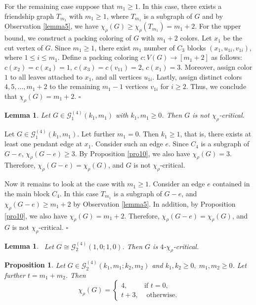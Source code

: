 \documentclass[12pt]{article}
\newtheorem{lemma}[theorem]{Lemma}
\newtheorem{proposition}[theorem]{Proposition}
\newcommand{\proof}{\noindent{\bf Proof.\ }}
\newcommand{\qed}{\hfill $\square$ \bigskip}
\newcommand{\ie}{that is}
\begin{document}
For the remaining case suppose that  \( m_1 \geq 1 \). In this case, there exists a friendship graph $T_{m_1}$ with \( m_1 \geq 1 \), where $T_{m_1}$ is a subgraph of $G$ and by Observation \ref{lemma5}, we have $\chi_\rho(G) \geq \chi_\rho(T_{m_1}) = m_1+2$.
For the upper bound, we construct a  packing coloring of $G$ with $m_1+2$ colors.  
Let $x_1$ be the cut vertex of $G$. Since $m_1 \geq 1$, there exist $m_1$ number of $C_3$ blocks $(x_1,u_{1i},v_{1i})$, where $1 \leq i \leq m_1$. Define a packing coloring $c:V(G)\to[m_1+2]$ as follows: $c(x_2) = c(x_4)=1$, $c(x_3)=c(v_{11})=2$, $c(x_1) = 3$.
Moreover, assign color $1$ to all leaves attached to $x_1$, and all vertices $u_{1i}$.
Lastly, assign distinct colors $4, 5,\dots,m_1+2$ to the remaining $m_1-1$ vertices $v_{1i}$  for $i \geq 2$. Thus, we conclude that  $\chi_\rho(G) =  m_1+2$.
\qed

\begin{lemma}\label{pro11}
Let $G \in \mathcal{G}_{1}^{(4)}(k_1,m_1)$ with $k_1, m_1 \geq 0$. Then $G$ is not $\chi_{\rho}$-critical.	
\end{lemma}

\proof
Let $G \in \mathcal{G}_{1}^{(4)}(k_1,m_1)$.	Let further $m_1=0$. Then $k_1 \geq 1$, \ie, there exists at least one pendant edge at $x_1$. Consider such an edge $e$. Since $C_4$ is a subgraph of $G-e$, $\chi_{\rho}(G-e) \geq 3$. By Proposition \ref{pro10}, we also have $\chi_{\rho}(G)=3$. Therefore, $\chi_\rho(G-e)=\chi_\rho(G)$, and $G$ is not $\chi_\rho$-critical.
	
Now it remains to look at the case with $m_1 \geq 1$. Consider an edge $e$ contained in the  main block $C_4$. In this case $T_{m_1}$ is a subgraph of $G-e$, and $\chi_{\rho}(G-e) \geq m_1+2$ by Observation \ref{lemma5}. In addition, by Proposition \ref{pro10}, we also have $\chi_{\rho}(G)=m_1+2$. Therefore, $\chi_\rho(G-e)=\chi_\rho(G)$, and $G$ is not $\chi_\rho$-critical.
\qed

\begin{lemma}~{\rm \cite{bresar-2022}}\label{lemma6}
Let $G \cong \mathcal{G}_{2}^{(4)}(1,0;1,0)$. Then $G$ is $4$-$\chi_{\rho}$-critical.
\end{lemma}

\begin{proposition}\label{pro12}
Let $G \in \mathcal{G}_{2}^{(4)}(k_{1},m_{1};k_{2},m_{2})$ and $k_1, k_2 \geq 0, \; m_1, m_2 \geq 0$. Let further $t = m_1+m_2$. Then	
\[
\chi_\rho(G) =
\begin{cases}
4, & \text{if } t = 0, \\[6pt]
t+3, & \text{ otherwise}.
\end{cases}
\]
\end{proposition}
\end{document}
